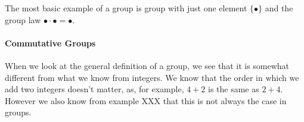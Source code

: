 \begin{example}
The most basic example of a group is group with just one element $\{\bullet\}$ and the group law $\bullet\cdot \bullet=\bullet$.
\end{example}
\paragraph{Commutative Groups} When we look at the general definition of a group, we see that it is somewhat different from what we know from integers. We know that the order in which we add two integers doesn't matter, as, for example, $4+2$ is the same as $2+4$. However we also know from example XXX that this is not always the case in groups.

